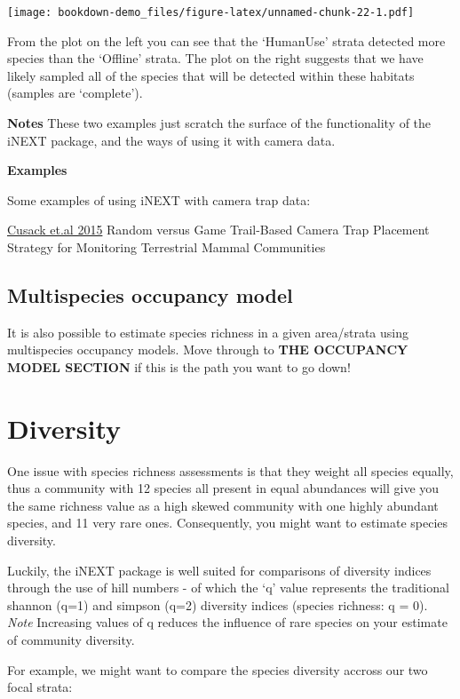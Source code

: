 \documentclass[]{book}
\begin{document}
\texttt{[image: bookdown-demo\_files/figure-latex/unnamed-chunk-22-1.pdf]}

From the plot on the left you can see that the `HumanUse' strata
detected more species than the `Offline' strata. The plot on the right
suggests that we have likely sampled all of the species that will be
detected within these habitats (samples are `complete').

\textbf{Notes} These two examples just scratch the surface of the
functionality of the iNEXT package, and the ways of using it with camera
data.

\textbf{Examples}

Some examples of using iNEXT with camera trap data:

\href{https://journals.plos.org/plosone/article?id=10.1371/journal.pone.0126373}{Cusack
et.al 2015} Random versus Game Trail-Based Camera Trap Placement
Strategy for Monitoring Terrestrial Mammal Communities

\subsection{Multispecies occupancy
model}\label{multispecies-occupancy-model}

It is also possible to estimate species richness in a given area/strata
using multispecies occupancy models. Move through to \textbf{THE
OCCUPANCY MODEL SECTION} if this is the path you want to go down!

\section{Diversity}\label{diversity}

One issue with species richness assessments is that they weight all
species equally, thus a community with 12 species all present in equal
abundances will give you the same richness value as a high skewed
community with one highly abundant species, and 11 very rare ones.
Consequently, you might want to estimate species diversity.

Luckily, the iNEXT package is well suited for comparisons of diversity
indices through the use of hill numbers - of which the `q' value
represents the traditional shannon (q=1) and simpson (q=2) diversity
indices (species richness: q = 0). \emph{Note} Increasing values of q
reduces the influence of rare species on your estimate of community
diversity.

For example, we might want to compare the species diversity accross our
two focal strata:
\end{document}
